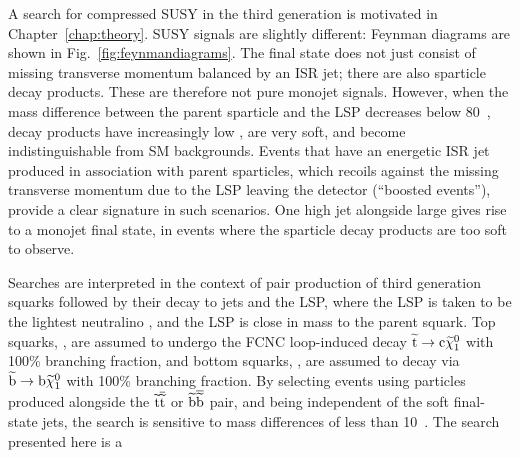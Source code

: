 A search for compressed \ac{SUSY} in the third generation is motivated in Chapter~\ref{chap:theory}.
\ac{SUSY} signals are slightly different: Feynman diagrams are shown in Fig.~\ref{fig:feynmandiagrams}. 
The final state does not just consist of missing transverse momentum balanced by an ISR jet; 
there are also sparticle decay products.
These are therefore not pure monojet signals.
However, when the mass difference between the parent sparticle and the \ac{LSP} decreases below 80~\GeV {}, decay products have increasingly low \pt, are very soft, 
and become indistinguishable from \ac{SM} backgrounds.
Events that have an energetic \ac{ISR} jet produced in association with parent sparticles, which recoils against the missing transverse momentum due to the LSP leaving the detector (``boosted events''),
provide a clear signature in such scenarios.
One high \pt{} jet alongside large \MET gives rise to a monojet final state, in events where the sparticle decay products are too soft to observe.


Searches are interpreted in the context of pair production of 
third generation squarks followed by their decay to jets and the LSP, where the LSP is taken to be the lightest neutralino \chiOneZero, 
and the LSP is close in mass to the parent squark.
Top squarks, \sTop, are assumed to undergo the \ac{FCNC} loop-induced decay $\widetilde{{\rm t}} \rightarrow {\rm c} \widetilde{\chi}^{0}_{1}$ with 100\% branching fraction, and
bottom squarks, \sBot, are assumed to decay via 
$\widetilde{{\rm b}} \rightarrow {\rm b} \widetilde{\chi}^{0}_{1}$ with 100\% branching fraction.
By selecting events using particles produced alongside the $\widetilde{{\rm t}}\overline{\widetilde{\mathrm{t}}}$ or $\widetilde{{\rm b}}\overline{\widetilde{\mathrm{b}}}$ pair, and being independent of the soft final-state jets, the search is sensitive to mass differences of less than 10~\GeV.
The search presented here is a


